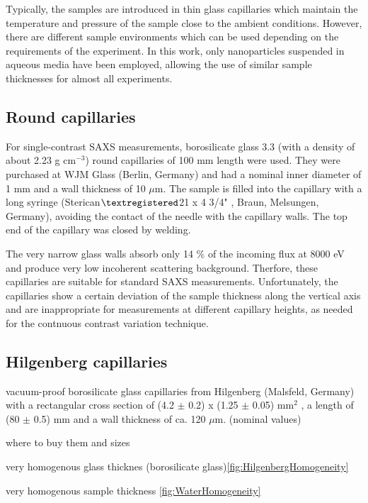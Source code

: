Typically, the samples are introduced in thin glass capillaries which maintain the temperature and pressure of the sample close to the ambient conditions. However, there are different sample environments which can be used depending on the requirements of the experiment. In this work, only nanoparticles suspended in aqueous media have been employed, allowing the use of similar sample thicknesses for almost all experiments.

\subsection{Round capillaries}

For single-contrast SAXS measurements, borosilicate glass 3.3 (with a density of about 2.23 g cm$^{-3}$) round capillaries of 100 mm length were used. They were purchased at WJM Glass (Berlin, Germany) and had a nominal inner diameter of 1 mm and a wall thickness of 10 $\mu$m. The sample is filled into the capillary with a long syringe (Sterican$\textregistered$21 x 4 3/4" , Braun, Melsungen, Germany), avoiding the contact of the needle with the capillary walls. The top end of the capillary was closed by welding.

The very narrow glass walls absorb only 14 $\%$ of the incoming flux at 8000 eV and produce very low incoherent scattering background. Therfore, these capillaries are suitable for standard SAXS measurements. Unfortunately, the capillaries show a certain deviation of the sample thickness along the vertical axis and are inappropriate for measurements at different capillary heights, as needed for the contnuous contrast variation technique.




\subsection{Hilgenberg capillaries}


vacuum-proof borosilicate glass capillaries from Hilgenberg (Malsfeld, Germany) with a rectangular cross section of (4.2 $\pm$ 0.2) x (1.25 $\pm$ 0.05) mm$^2$ , a length of (80 $\pm$ 0.5) mm and a wall thickness of ca. 120 $\mu$m. (nominal values)



where to buy them and sizes

very homogenous glass thicknes (borosilicate glass)\ref{fig:HilgenbergHomogeneity}

very homogenous sample thickness \ref{fig:WaterHomogeneity}

